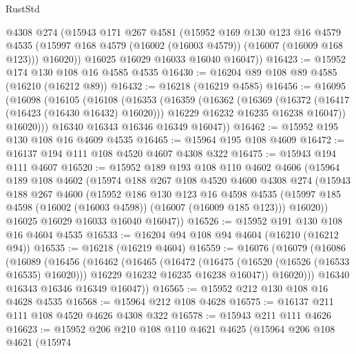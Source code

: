 \begin{lexlean}{RustStd}
\begin{coremodule}
        @4308
        @274
        (@15943
          @171
          @267
          @4581
          (@15952
            @169
            @130
            @123
            @16
            @4579
            @4535
            (@15997 @168 @4579 (@16002 (@16003 @4579)) (@16007 (@16009 @168 @123)))
            @16020))
        @16025
        @16029
        @16033
        @16040
        @16047))
@16423 := @15952 @174 @130 @108 @16 @4585 @4535
@16430 := @16204 @89 @108 @89 @4585 (@16210 (@16212 @89))
@16432 := @16218 (@16219 @4585)
@16456 := @16095
    (@16098
      (@16105
        (@16108
          (@16353
            (@16359
              (@16362
                (@16369
                  (@16372 (@16417 (@16423 (@16430 @16432) @16020)))
                  @16229
                  @16232
                  @16235
                  @16238
                  @16047))
              @16020)))
        @16340
        @16343
        @16346
        @16349
        @16047))
@16462 := @15952 @195 @130 @108 @16 @4609 @4535
@16465 := @15964 @195 @108 @4609
@16472 := @16137 @194 @111 @108 @4520 @4607 @4308 @322
@16475 := @15943 @194 @111 @4607
@16520 := @15952
    @189
    @193
    @108
    @110
    @4602
    @4606
    (@15964
      @189
      @108
      @4602
      (@15974
        @188
        @267
        @108
        @4520
        @4600
        @4308
        @274
        (@15943
          @188
          @267
          @4600
          (@15952
            @186
            @130
            @123
            @16
            @4598
            @4535
            (@15997 @185 @4598 (@16002 (@16003 @4598)) (@16007 (@16009 @185 @123)))
            @16020))
        @16025
        @16029
        @16033
        @16040
        @16047))
@16526 := @15952 @191 @130 @108 @16 @4604 @4535
@16533 := @16204 @94 @108 @94 @4604 (@16210 (@16212 @94))
@16535 := @16218 (@16219 @4604)
@16559 := @16076
    (@16079
      (@16086
        (@16089
          (@16456
            (@16462
              (@16465
                (@16472
                  (@16475 (@16520 (@16526 (@16533 @16535) @16020)))
                  @16229
                  @16232
                  @16235
                  @16238
                  @16047))
              @16020)))
        @16340
        @16343
        @16346
        @16349
        @16047))
@16565 := @15952 @212 @130 @108 @16 @4628 @4535
@16568 := @15964 @212 @108 @4628
@16575 := @16137 @211 @111 @108 @4520 @4626 @4308 @322
@16578 := @15943 @211 @111 @4626
@16623 := @15952
    @206
    @210
    @108
    @110
    @4621
    @4625
    (@15964
      @206
      @108
      @4621
      (@15974

\end{coremodule}
\end{lexlean}
